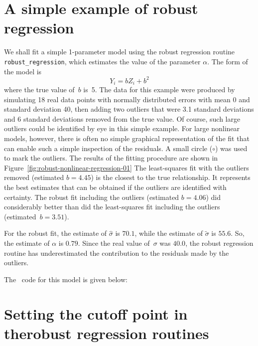 \documentclass{admbmanual}
\begin{document}
\section{A simple example of robust regression}

We shall fit a simple 1-parameter model using
the robust regression routine \texttt{robust\_regres\-sion}, which
estimates the value of the parameter $\alpha$. 
The form of the model is
\begin{equation*}
  Y_i=bZ_i+b^2
\end{equation*}
where the true value of~$b$ is~5.
The data for this example were produced by simulating 18 real data points
with normally distributed errors with mean $0$ and
standard deviation 40,  then 
adding two outliers that were 3.1 standard deviations and 6 standard
deviations removed from the true value. Of course, such large outliers
could be identified by eye in this simple example. For large 
nonlinear models, however, there is often no simple 
graphical representation of 
the fit that can enable such a simple inspection of the residuals.
A small circle ($\circ$) was used to mark the outliers.
The results of the fitting procedure are shown in Figure~\ref{fig:robust-nonlinear-regression-01} %
The least-squares fit with the outliers removed (estimated $b=4.45$)
is the closest to the true relationship. It represents the best estimates
that can be obtained if the outliers are identified with certainty. 
The robust fit including the outliers (estimated $b=4.06$) did
considerably better than did the least-squares fit including the
outliers (estimated~$b=3.51$). 

For the robust fit, the estimate of $\hat\sigma$ is $70.1$, while
the estimate of $\tilde\sigma$ is $55.6$.  So, the estimate
of $\alpha$ is $0.79$. Since the real value 
of~$\sigma$ was $40.0$, the robust regression routine has underestimated
the contribution to the residuals made by the outliers. 


The \scAD\ code for this model is given below:







\section{Setting the cutoff point in the\br robust regression routines}
\label{sec:setting-cutoff}
\end{document}
